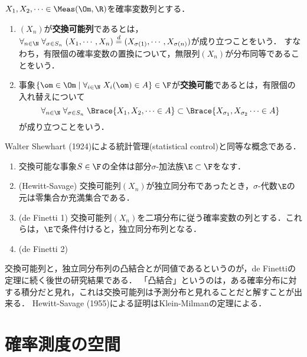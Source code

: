 \documentclass[uplatex,dvipdfmx]{jsreport}
\begin{document}
\begin{definition}[exchangeable]
    $X_1,X_2,\cdots\in\Meas(\Om,\R)$を確率変数列とする．
    \begin{enumerate}
        \item $(X_n)$が\textbf{交換可能列}であるとは，$\forall_{n\in\N}\;\forall_{\sigma\in S_n}\;(X_1,\cdots,X_n)\overset{d}{=}(X_{\sigma(1)},\cdots,X_{\sigma(n)})$が成り立つことをいう．
        すなわち，有限個の確率変数の置換について，無限列$(X_n)$が分布同等であることをいう．
        \item 事象$\{\om\in\Om\mid\forall_{i\in\N}\;X_i(\om)\in A\}\in\F$が\textbf{交換可能}であるとは，有限個の入れ替えについて
        \[\forall_{n\in\N}\;\forall_{\sigma\in S_n}\;\Brace{X_1,X_2,\cdots\in A}\subset\Brace{X_{\sigma_1},X_{\sigma_2}\cdots\in A}\]
        が成り立つことをいう．
    \end{enumerate}
\end{definition}
\begin{remarks}
    Walter Shewhart (1924)による統計管理(statistical control)と同等な概念である．
\end{remarks}

\begin{theorem}\mbox{}
    \begin{enumerate}
        \item 交換可能な事象$S\in\F$の全体は部分$\sigma$-加法族$\E\subset\F$をなす．
        \item (Hewitt-Savage) 交換可能列$(X_n)$が独立同分布であったとき，$\sigma$-代数$\E$の元は零集合か充満集合である．
        \item (de Finetti 1) 交換可能列$(X_n)$を二項分布に従う確率変数の列とする．これらは，$\E$で条件付けると，独立同分布列となる．
        \item (de Finetti 2) 
    \end{enumerate}
\end{theorem}
\begin{remarks}
    交換可能列と，独立同分布列の凸結合とが同値であるというのが，de Finettiの定理に続く後世の研究結果である．
    「凸結合」というのは，ある確率分布に対する積分だと見れ，これは交換可能列は予測分布と見れることだと解すことが出来る．
    Hewitt-Savage (1955)による証明はKlein-Milmanの定理による．
\end{remarks}

\chapter{確率測度の空間}
\end{document}
